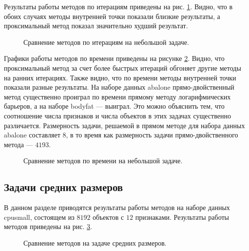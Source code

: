 \documentclass[12pt]{article}
\begin{document}
	Результаты работы методов по итерациям приведены на рис. \ref{small}. Видно, что в обоих случаях методы внутренней точки показали близкие результаты, а проксимальный метод показал значительно худший результат.

	\begin{figure}[!h]
		\centering
		\subfloat{
			\scalebox{0.9}{
				
			}
		}
		\subfloat{\
			\scalebox{0.9}{
	                		
			}
		}
		\caption{Сравнение методов по итерациям на небольшой задаче.}
		\label{small}
	\end{figure}

	Графики работы методов по времени приведены на рисунке \ref{small_t}. Видно, что проксимальный метод за счет более быстрых итераций обгоняет другие методы на ранних итерациях. Также видно, что по времени методы внутренней точки показали разные результаты.  На наборе данных abalone прямо-двойственный метод существенно проиграл по времени прямому методу логарифмических барьеров, а на наборе bodyfat — выиграл. Это можно объяснить тем, что соотношение числа признаков и числа объектов в этих задачах существенно различается. Размерность задачи, решаемой в прямом методе для набора данных abalone составляет $8$, в то время как размерность задачи прямо-двойственного метода — $4193$.
	
	\begin{figure}[!h]
		\centering
		\subfloat{
			\scalebox{0.9}{
				
			}
		}
		\subfloat{\
			\scalebox{0.9}{
	                		
			}
		}
		\caption{Сравнение методов по времени на небольшой задаче.}
		\label{small_t}
	\end{figure}

	\subsection{Задачи средних размеров}
	
	В данном разделе приводятся результаты работы методов на наборе данных cpusmall, состоящем из $8192$ объектов с $12$ признаками.  Результаты работы методов приведены на рис. \ref{mid}.
	
	\begin{figure}[!h]
		\centering
		\subfloat{
			\scalebox{0.9}{
				
			}
		}
		\subfloat{\
			\scalebox{0.9}{
	                		
			}
		}
		\caption{Сравнение методов на задаче средних размеров.}
		\label{mid}
	\end{figure}
	
\end{document}
